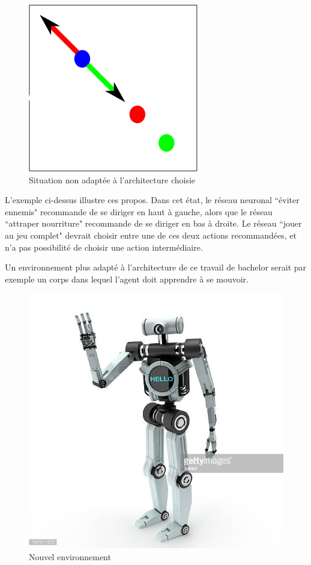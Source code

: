 \documentclass[11pt,a4paper]{report}
\begin{document}
   \begin{figure}[!h]
   \center
   \includegraphics[scale=0.3]{ressources/percpective.png}
   \caption{Situation non adaptée à l'architecture choisie}
   \end{figure} 

  \newpage
  \par L'exemple ci-dessus illustre ces propos. Dans cet état, le réseau neuronal ``éviter ennemis" recommande de se diriger en haut à gauche, alors que le réseau  ``attraper nourriture" recommande de se diriger en bas à droite. Le réseau ``jouer au jeu complet" devrait choisir entre une de ces deux actions recommandées, et n'a pas possibilité de choisir une action intermédiaire. 
  
  \par Un environnement plus adapté à l'architecture de ce travail de bachelor serait par exemple un corps dans lequel l'agent doit apprendre à se mouvoir. 
  
   \begin{figure}[!h]
   \center
   \includegraphics[scale=1]{ressources/robot.jpg}
   \caption{Nouvel environnement}
   \end{figure} 
   
\end{document}
